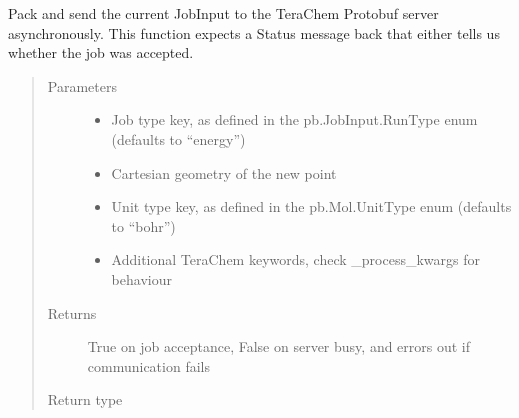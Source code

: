 \documentclass[letterpaper,10pt,english]{sphinxmanual}
\begin{document}
\begin{fulllineitems}
\begin{fulllineitems}
\begin{quote}
\begin{description}
\end{description}\end{quote}

\end{fulllineitems}


\begin{fulllineitems}
\label{\detokenize{tcpb:tcpb.tcpb.TCProtobufClient.send_job_async}}
Pack and send the current JobInput to the TeraChem Protobuf server asynchronously.
This function expects a Status message back that either tells us whether the job was accepted.
\begin{quote}\begin{description}
\item[{Parameters}] \leavevmode\begin{itemize}
\item {} 
 \textendash{} Job type key, as defined in the pb.JobInput.RunType enum (defaults to “energy”)

\item {} 
 \textendash{} Cartesian geometry of the new point

\item {} 
 \textendash{} Unit type key, as defined in the pb.Mol.UnitType enum (defaults to “bohr”)

\item {} 
 \textendash{} Additional TeraChem keywords, check \_process\_kwargs for behaviour

\end{itemize}

\item[{Returns}] \leavevmode
True on job acceptance, False on server busy, and errors out if communication fails

\item[{Return type}] \leavevmode
{}

\end{description}\end{quote}

\end{fulllineitems}


\end{fulllineitems}
\end{document}
